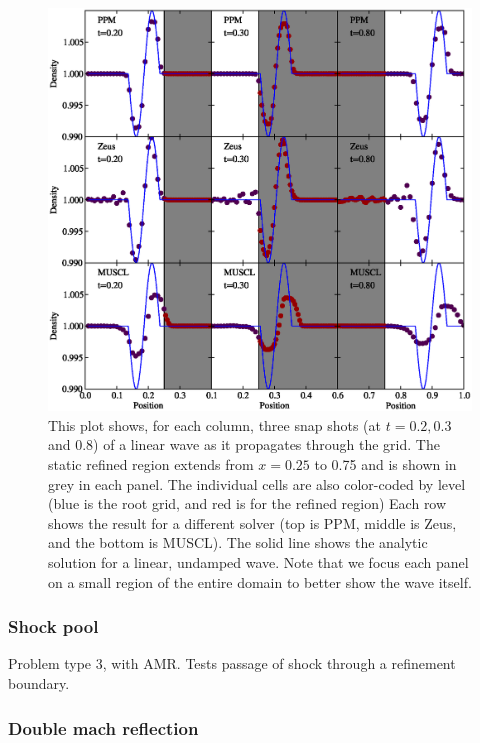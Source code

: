 \begin{figure}
\begin{center}
\includegraphics[width=\textwidth]{figures/WavePool.eps}
\caption{This plot shows, for each column, three snap shots (at $t=0.2, 0.3$ and 0.8) of a linear wave as it propagates through the grid.  The static refined region extends from $x = 0.25$ to 0.75 and is shown in grey in each panel.  The individual cells are also color-coded by level (blue is the root grid, and red is for the refined region)  Each row shows the result for a different solver (top is PPM, middle is Zeus, and the bottom is MUSCL).   The solid line shows the analytic solution for a linear, undamped wave.  Note that we focus each panel on a small region of the entire domain to better show the wave itself.}
\label{fig.wavepool}
\end{center}
\end{figure}

\subsubsection{Shock pool}
\label{sec.tests.shockpool}
Problem type 3, with AMR.  Tests passage of shock through a refinement boundary.

\subsubsection{Double mach reflection}
\label{sec.tests.doublemach}

